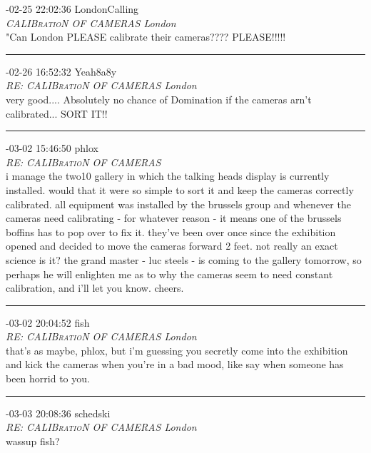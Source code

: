 \begin{mail}

{-02-25 22:02:36 LondonCalling}\\
{\itshape CALIB\textsc{ratio}N OF CAMERAS London}\\
"Can London PLEASE calibrate their cameras???? PLEASE!!!!!\\

\rule{0.8\textwidth}{.4pt}

{-02-26 16:52:32 Yeah8a8y}\\
{\itshape RE: CALIB\textsc{ratio}N OF CAMERAS London}\\
very good.... Absolutely no chance of Domination if the cameras arn't calibrated... SORT IT!!\\

\rule{0.8\textwidth}{.4pt}

{-03-02 15:46:50} phlox\\
{\itshape RE: CALIB\textsc{ratio}N OF CAMERAS}\\
i manage the two10 gallery in which the talking heads display is currently installed. would that it were so simple to sort it and keep the cameras correctly calibrated. all equipment was installed by the brussels group and whenever the cameras need calibrating - for whatever reason - it means one of the brussels boffins has to pop over to fix it. they've been over once since the exhibition opened and decided to move the cameras forward 2 feet. not really an exact science is it? the grand master - luc steels - is coming to the gallery tomorrow, so perhaps he will enlighten me as to why the cameras seem to need constant calibration, and i'll let you know. cheers.\\

\rule{0.8\textwidth}{.4pt}

{-03-02 20:04:52 fish}\\
{\itshape RE: CALIB\textsc{ratio}N OF CAMERAS London}\\
that's as maybe, phlox, but i'm guessing you secretly come into the exhibition and kick the cameras when 
you're in a bad mood, like say when someone has been horrid to you.\\

\rule{0.8\textwidth}{.4pt}

{-03-03 20:08:36 schedski}\\
{\itshape RE: CALIB\textsc{ratio}N OF CAMERAS London}\\
wassup fish?\enlargethispage{1\baselineskip}\\


\end{mail}
